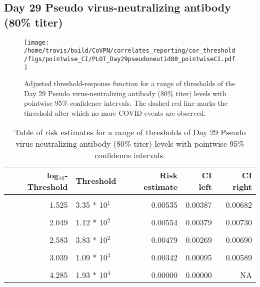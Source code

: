 \documentclass[]{book}
\theoremstyle{definition}
\theoremstyle{definition}
\theoremstyle{definition}
\newcommand{\1}{\mathbbm{1}}
\begin{document}
\newpage

\newpage

\newpage

\hypertarget{day-29-pseudo-virus-neutralizing-antibody-80-titer}{%
\subsection{Day 29 Pseudo virus-neutralizing antibody (80\% titer)}\label{day-29-pseudo-virus-neutralizing-antibody-80-titer}}

\begin{figure}[H]
\centering
\texttt{[image: /home/travis/build/CoVPN/correlates\_reporting/cor\_threshold/figs/pointwise\_CI/PLOT\_Day29pseudoneutid80\_pointwiseCI.pdf]}
\caption{Adjusted threshold-response function for a range of thresholds of the
  Day 29 Pseudo virus-neutralizing antibody (80\% titer) levels with pointwise 95\% confidence intervals. The dashed red line marks the threshold after which no more COVID events are observed. }
\end{figure}
\begin{table}[!h]

\caption{\label{tab:unnamed-chunk-361}Table of risk estimates for a range of thresholds of Day 29 Pseudo virus-neutralizing antibody (80\% titer) levels with pointwise 95\% confidence intervals.}
\centering
\begin{tabular}[t]{rlrrr}
\toprule
log$_{10}$-Threshold & Threshold & Risk estimate & CI left & CI right\\
\midrule
\cellcolor{gray!6}{0.699} & \cellcolor{gray!6}{5.00 * 10$^0$} & \cellcolor{gray!6}{0.00585} & \cellcolor{gray!6}{0.00442} & \cellcolor{gray!6}{0.00727}\\
1.525 & 3.35 * 10$^1$ & 0.00535 & 0.00387 & 0.00682\\
\cellcolor{gray!6}{1.840} & \cellcolor{gray!6}{6.92 * 10$^1$} & \cellcolor{gray!6}{0.00580} & \cellcolor{gray!6}{0.00412} & \cellcolor{gray!6}{0.00748}\\
2.049 & 1.12 * 10$^2$ & 0.00554 & 0.00379 & 0.00730\\
\cellcolor{gray!6}{2.276} & \cellcolor{gray!6}{1.89 * 10$^2$} & \cellcolor{gray!6}{0.00542} & \cellcolor{gray!6}{0.00350} & \cellcolor{gray!6}{0.00733}\\
2.583 & 3.83 * 10$^2$ & 0.00479 & 0.00269 & 0.00690\\
\cellcolor{gray!6}{2.785} & \cellcolor{gray!6}{6.10 * 10$^2$} & \cellcolor{gray!6}{0.00559} & \cellcolor{gray!6}{0.00288} & \cellcolor{gray!6}{0.00830}\\
3.039 & 1.09 * 10$^3$ & 0.00342 & 0.00095 & 0.00589\\
\cellcolor{gray!6}{3.351} & \cellcolor{gray!6}{2.24 * 10$^3$} & \cellcolor{gray!6}{0.00161} & \cellcolor{gray!6}{0.00000} & \cellcolor{gray!6}{0.00398}\\
4.285 & 1.93 * 10$^4$ & 0.00000 & 0.00000 & NA\\
\bottomrule
\end{tabular}
\end{table}
\end{document}
